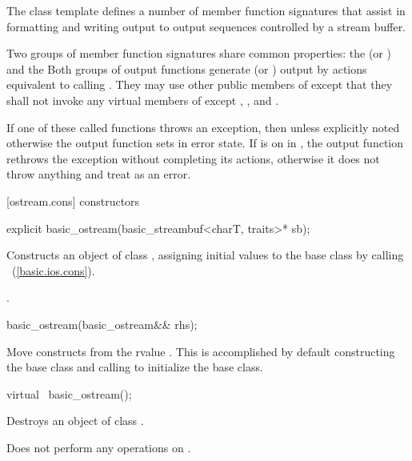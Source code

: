 \pnum
The class template
defines a number of member function
signatures that assist in formatting and writing output to output sequences
controlled by a stream buffer.

\pnum
Two groups of member function signatures share common properties:
the
(or
)
and the
Both groups of output functions generate (or
)
output
by actions equivalent to calling
.
They may use other public members of
except that they shall not invoke any virtual members of
except
,
,
and
.

\pnum
If one of these called functions throws an exception, then unless explicitly noted otherwise
the output function sets
in error state.
If
is on in
,
the output function
rethrows the exception without completing its actions, otherwise
it does not throw anything and treat as an error.

[ostream.cons]{ constructors}

%
\begin{itemdecl}
explicit basic_ostream(basic_streambuf<charT, traits>* sb);
\end{itemdecl}

%
\begin{itemdescr}
\pnum
\effects
Constructs an object of class
,
assigning initial values to the base class by calling
~(\ref{basic.ios.cons}).

\pnum
\postcondition
{}.

%
\begin{itemdecl}
basic_ostream(basic_ostream&& rhs);
\end{itemdecl}

\begin{itemdescr}
\pnum
\effects Move constructs from the rvalue .
This is accomplished by default constructing the base class and calling
 to initialize the
base class.
\end{itemdescr}

%
\begin{itemdecl}
virtual ~basic_ostream();
\end{itemdecl}

\pnum
\effects
Destroys an object of class
.

\pnum
\remarks
Does not perform any operations on
.
\end{itemdescr}

